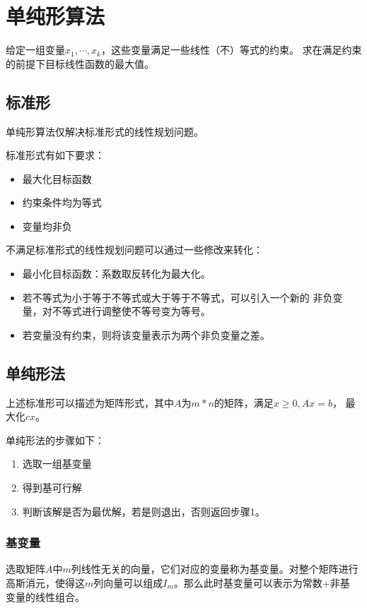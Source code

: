 \section{单纯形算法}
给定一组变量$x_1,\cdots,x_k$，这些变量满足一些线性（不）等式的约束。
求在满足约束的前提下目标线性函数的最大值。

\subsection{标准形}
单纯形算法仅解决标准形式的线性规划问题。

标准形式有如下要求：
\begin{itemize}
    \item 最大化目标函数
    \item 约束条件均为等式
    \item 变量均非负
\end{itemize}

不满足标准形式的线性规划问题可以通过一些修改来转化：
\begin{itemize}
    \item 最小化目标函数：系数取反转化为最大化。
    \item 若不等式为小于等于不等式或大于等于不等式，可以引入一个新的
    非负变量，对不等式进行调整使不等号变为等号。
    \item 若变量没有约束，则将该变量表示为两个非负变量之差。
\end{itemize}

\subsection{单纯形法}
上述标准形可以描述为矩阵形式，其中$A$为$m*n$的矩阵，满足$x\geq 0,Ax=b$，
最大化$cx$。

单纯形法的步骤如下：
\begin{enumerate}
    \item 选取一组基变量
    \item 得到基可行解
    \item 判断该解是否为最优解，若是则退出，否则返回步骤1。
\end{enumerate}

\subsubsection{基变量}
选取矩阵$A$中$m$列线性无关的向量，它们对应的变量称为基变量。对整个矩阵进行
高斯消元，使得这$m$列向量可以组成$I_m$。那么此时基变量可以表示为常数+非基
变量的线性组合。

